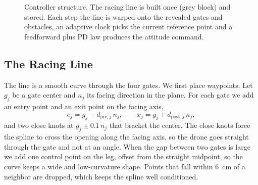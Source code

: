 \documentclass[conference]{IEEEtran}
\begin{document}
\begin{figure}[t]
\centering
{}
\caption{Controller structure. The racing line is built once (grey block) and stored. Each step the line is warped onto the revealed gates and obstacles, an adaptive clock picks the current reference point and a feedforward plus PD law produces the attitude command.}
\label{fig:pipeline}
\end{figure}

\subsection{The Racing Line}
\label{sec:line}
The line is a smooth curve through the four gates. We first place waypoints. Let $g_j$ be a gate center and $n_j$ its facing direction in the plane. For each gate we add an entry point and an exit point on the facing axis,
\begin{equation}
e_j = g_j - d_{\text{pre},j}\, n_j, \qquad x_j = g_j + d_{\text{post},j}\, n_j,
\label{eq:entryexit}
\end{equation}
and two close knots at $g_j \pm 0.1\, n_j$ that bracket the center. The close knots force the spline to cross the opening along the facing axis, so the drone goes straight through the gate and not at an angle. When the gap between two gates is large we add one control point on the leg, offset from the straight midpoint, so the curve keeps a wide and low-curvature shape. Points that fall within 6~cm of a neighbor are dropped, which keeps the spline well conditioned.
\end{document}
